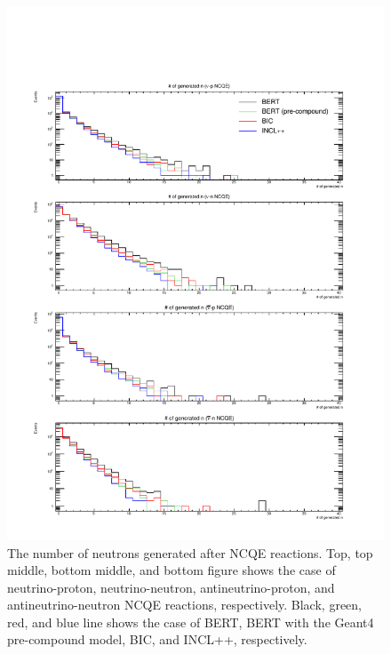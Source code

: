\begin{figure}[h]
	\centering
	\includegraphics[width=16cm]{PDF/Secondary/Comparison_PreCompound/neutron/pdf1/Logy_NumSec}
	\caption[The number of neutrons generated after NCQE reactions]{
	The number of neutrons generated after NCQE reactions.
	Top, top middle, bottom middle, and bottom figure shows the case of neutrino-proton, neutrino-neutron, antineutrino-proton, and antineutrino-neutron NCQE reactions, respectively.
	Black, green, red, and blue line shows the case of BERT, BERT with the Geant4 pre-compound model, BIC, and INCL++, respectively.
	}\label{Others_neutron_Logy_NumSec}
\end{figure}

